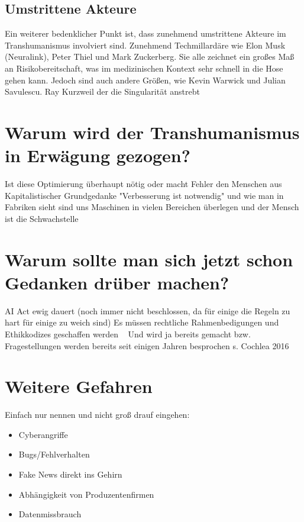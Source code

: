 \documentclass[a4paper,
DIV=13,
12pt,
BCOR=10mm,
department=FakEI,
twoside,
parskip=half,
automark,
]{OTHRartcl}
\begin{document}
\subsection*{Umstrittene Akteure}
Ein weiterer bedenklicher Punkt ist, dass zunehmend umstrittene Akteure im Transhumanismus involviert sind. Zunehmend Techmillardäre wie Elon Musk (Neuralink), Peter Thiel und Mark Zuckerberg.
Sie alle zeichnet ein großes Maß an Risikobereitschaft, was im medizinischen Kontext sehr schnell in die Hose gehen kann. Jedoch sind auch andere Größen, wie Kevin Warwick und Julian Savulescu.
Ray Kurzweil der die Singularität anstrebt


\section*{Warum wird der Transhumanismus in Erwägung gezogen?}
Ist diese Optimierung überhaupt nötig oder macht Fehler den Menschen aus
Kapitalistischer Grundgedanke "Verbesserung ist notwendig" und wie man in Fabriken sieht sind uns Maschinen in vielen Bereichen überlegen und der Mensch ist die Schwachstelle

\section*{Warum sollte man sich jetzt schon Gedanken drüber machen?}
AI Act ewig dauert (noch immer nicht beschlossen, da für einige die Regeln zu hart für einige zu weich sind) Es müssen rechtliche Rahmenbedigungen und Ethikkodizes geschaffen werden ~\cite{breczko2021human}
Und wird ja bereits gemacht bzw. Fragestellungen werden bereits seit einigen Jahren besprochen s. Cochlea 2016

\section*{Weitere Gefahren}
Einfach nur nennen und nicht groß drauf eingehen:
\begin{itemize}
    \item Cyberangriffe
    \item Bugs/Fehlverhalten
    \item Fake News direkt ins Gehirn
    \item Abhängigkeit von Produzentenfirmen
    \item Datenmissbrauch
\end{itemize}


\newpage


\newpage
\end{document}
